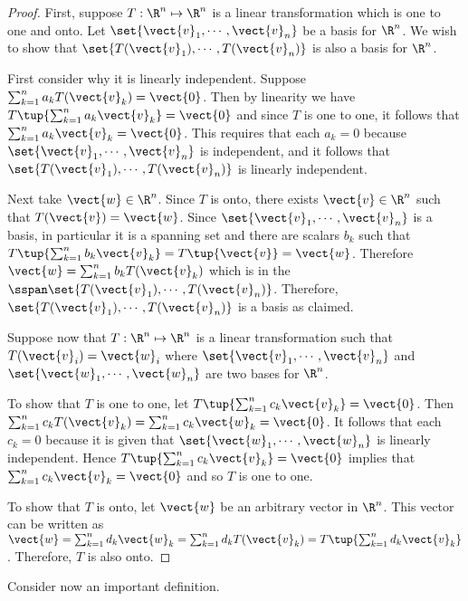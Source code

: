 \begin{proof}
First, suppose $T:\R^n \mapsto \R^n$ is a linear
transformation which is one to one and onto. Let $\set{
\vect{v}_{1},\cdots ,\vect{v}_{n}} $ be a basis for
$\R^n$. We wish to show that $\set{T(\vect{v}_{1}),\cdots ,
T(\vect{v}_{n})} $ is also a basis for $\R^n$. 

First consider why it is linearly independent. Suppose
$\sum_{k=1}^{n}a_{k}T(\vect{v}_{k})=\vect{0}$. Then by linearity we have $T\tup{
\sum_{k=1}^{n}a_{k}\vect{v}_{k}} =\vect{0}$ and since $T$ is one
to one, it follows that $\sum_{k=1}^{n}a_{k}\vect{v}_{k}=\vect{0}$.
This requires that  each $a_{k}=0$ because $\set{\vect{v}_{1},\cdots,
\vect{v}_{n}} $ is independent, and it follows that $\set{
T(\vect{v}_{1}),\cdots , T(\vect{v}_{n})} $ is linearly
independent. 


Next take $\vect{w}\in \R^n$. Since $T$ is onto,
there exists $\vect{v}\in \R^n$ such that
$T(\vect{v})=\vect{w}$. Since $ \set{\vect{v}_{1},\cdots
,\vect{v}_{n}} $ is a basis, in particular it is a spanning set
and there are scalars $b_{k}$ such that $T\tup{
\sum_{k=1}^{n}b_{k}\vect{v} _{k}} =T\tup{\vect{v}}
=\vect{w}$. Therefore $\vect{w} =\sum_{k=1}^{n}b_{k}T(\vect{v}_{k})$
which is in the $\sspan\set{T(\vect{v}_{1}),\cdots ,
T(\vect{v}_{n})}$. Therefore, $\set{T(\vect{v}_{1}),\cdots
,T(\vect{v}_{n}) } $ is a basis as claimed.

Suppose now that $T: \R^n \mapsto \R^n$ is a linear
transformation such that $T(\vect{v}_{i})=\vect{w}_{i}$ where
$\set{\vect{v} _{1},\cdots ,\vect{v}_{n}} $ and $\set{
\vect{w}_{1},\cdots , \vect{w}_{n}} $ are two bases for
$\R^n$. 

To show that $T$ is one to one, let $T\tup{
\sum_{k=1}^{n}c_{k}\vect{v}_{k}} =\vect{0}$. Then
$\sum_{k=1}^{n}c_{k}T(\vect{v}_{k})=\sum_{k=1}^{n}c_{k}\vect{w}_{k}=\vect{
0}$. It follows that each $c_{k} = 0$ because it is given that
$\set{\vect{w} _{1},\cdots ,\vect{w}_{n}} $ is linearly
independent. Hence $T\tup{\sum_{k=1}^{n}c_{k}\vect{v}_{k}}
=\vect{0}$ implies that $\sum_{k=1}^{n}c_{k}\vect{v}_{k}=\vect{0}$ and
so $T$ is one to one.  

To show that $T$ is onto, let $\vect{w}$ be an arbitrary vector in
$\R^n$. This vector can be written as $\vect{w} =
\sum_{k=1}^{n}d_k\vect{w}_k =
\sum_{k=1}^{n}d_{k}T(\vect{v}_{k})=T\tup{\sum_{k=1}^{n}d_{k}
\vect{v}_{k}}$.  Therefore, $T$ is also onto. 
\end{proof}

Consider now an important definition.

